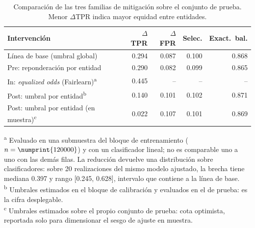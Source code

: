 
\begin{table}[htbp]
\centering
\caption{Comparación de las tres familias de mitigación sobre el conjunto de
prueba. Menor $\Delta$TPR indica mayor equidad entre entidades.}
\label{tab:mitigacion}
\small\setlength{\tabcolsep}{5pt}
\begin{tabular}{l r r r r}
\toprule
Intervención & $\Delta$TPR & $\Delta$FPR & Selec. & Exact.\ bal. \\
\midrule
Línea de base (umbral global) & 0.294 & 0.087 & 0.100 & 0.868 \\
Pre: reponderación por entidad & 0.290 & 0.082 & 0.099 & 0.865 \\
In: \emph{equalized odds} (Fairlearn)\textsuperscript{a} & 0.445 & -- & -- & -- \\
Post: umbral por entidad\textsuperscript{b} & 0.140 & 0.101 & 0.102 & 0.871 \\
Post: umbral por entidad (en muestra)\textsuperscript{c} & 0.022 & 0.107 & 0.101 & 0.869 \\
\bottomrule
\end{tabular}

\vspace{0.4em}
\begin{minipage}{0.95\linewidth}\footnotesize
\textsuperscript{a} Evaluado en una submuestra del bloque de entrenamiento
($n=\numprint{120000}$) y con un clasificador lineal; no es comparable uno a uno
con las demás filas. La reducción devuelve una distribución sobre clasificadores:
sobre 20 realizaciones del mismo modelo
ajustado, la brecha tiene mediana 0.397 y rango
[0.245, 0.628], intervalo
que contiene a la línea de base.\\
\textsuperscript{b} Umbrales estimados en el bloque de calibración y evaluados
en el de prueba: es la cifra desplegable.\\
\textsuperscript{c} Umbrales estimados sobre el propio conjunto de prueba:
cota optimista, reportada solo para dimensionar el sesgo de ajuste en muestra.
\end{minipage}
\end{table}
